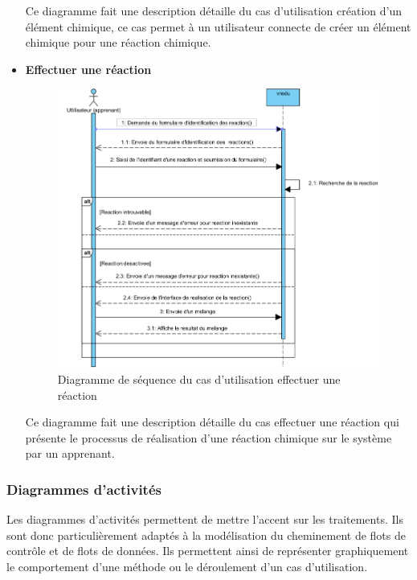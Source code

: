 \begin{itemize}
	      Ce diagramme fait une description détaille du cas d’utilisation création d’un élément chimique, ce cas permet à un utilisateur connecte de créer un élément chimique pour une réaction chimique.

	\newpage
	\item \textbf{Effectuer une réaction}

	      \begin{figure}[H]
		      \centering
		      \includegraphics[width=1\textwidth]{img/ucdeur}
		      \caption{Diagramme de séquence du cas d'utilisation effectuer une réaction}
		      \label{fig:mesh1}
	      \end{figure}

	      Ce diagramme fait une description détaille du cas effectuer une réaction qui présente le processus de réalisation d’une réaction chimique sur le système par un apprenant.
\end{itemize}

\newpage
\subsubsection{Diagrammes d’activités}

Les diagrammes d'activités permettent de mettre l'accent sur les traitements. Ils sont donc particulièrement adaptés à la modélisation du cheminement de flots de contrôle et de flots de données. Ils permettent ainsi de représenter graphiquement le comportement d'une méthode ou le déroulement d'un cas d'utilisation.

